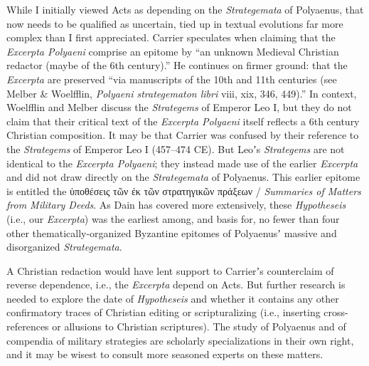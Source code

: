 While I initially viewed Acts as depending on the \textit{Strategemata} of Polyaenus, %
that now needs to be qualified as uncertain, tied up in textual evolutions far more complex than I first appreciated. %
Carrier speculates when claiming that the \textit{Excerpta Polyaeni} comprise an epitome by %
“an unknown Medieval Christian redactor (maybe of the 6th century).” %
He continues on firmer ground: that the \textit{Excerpta} are preserved %
“via manuscripts of the 10th and 11th centuries (see Melber \& Woelfflin, \textit{Polyaeni strategematon libri} viii, xix, 346, 449).” %
In context, Woelfflin and Melber discuss the \textit{Strategems} of Emperor Leo I, %
but they do not claim that their critical text of the %
\textit{Excerpta Polyaeni} itself reflects a 6th century Christian composition. %
It may be that Carrier was confused by their reference to the \textit{Strategems} of Emperor Leo I (457--474 CE). %
But Leoʼs \textit{Strategems} are not identical to the \textit{Excerpta Polyaeni}; %
they instead made use of the earlier \textit{Excerpta} %
and did not draw directly on the \textit{Strategemata} of Polyaenus. %
This earlier epitome is entitled the %
ὑποθέσεις τῶν ἐκ τῶν στρατηγικῶν πράξεων / %
\textit{Summaries of Matters from Military Deeds}. %
As Dain has covered more extensively, these \textit{Hypotheseis} (i.e., our \textit{Excerpta}) was the earliest among, %
and basis for, no fewer than four other thematically-organized Byzantine epitomes %
of Polyaenusʼ massive and disorganized \textit{Strategemata}. 

A Christian redaction would have lent support to Carrierʼs counterclaim of %
reverse dependence, i.e., the \textit{Excerpta} depend on Acts. %
But further research is needed to explore the date of \textit{Hypotheseis} %
and whether it contains any other confirmatory traces of Christian editing or scripturalizing %
(i.e., inserting cross-references or allusions to Christian scriptures). %
The study of Polyaenus and of compendia of military strategies are scholarly specializations in their own right, %
and it may be wisest to consult more seasoned experts on these matters. %
